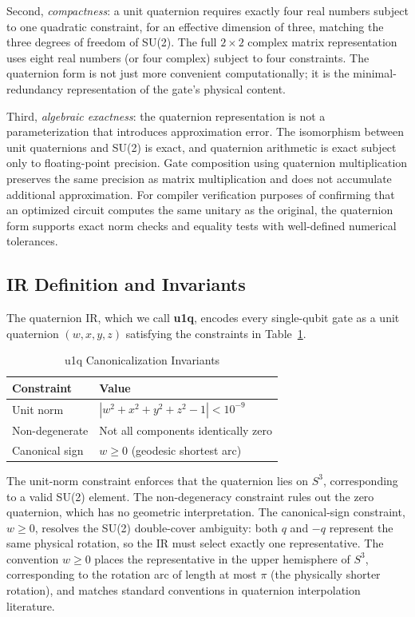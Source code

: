 \documentclass[conference]{IEEEtran}
\begin{document}
Second, \textit{compactness}: a unit quaternion requires exactly four real numbers subject
to one quadratic constraint, for an effective dimension of three, matching the three
degrees of freedom of SU(2). The full $2\times2$ complex matrix representation uses eight
real numbers (or four complex) subject to four constraints. The quaternion form is not just
more convenient computationally; it is the minimal-redundancy representation of the gate's
physical content.

Third, \textit{algebraic exactness}: the quaternion representation is not a parameterization
that introduces approximation error. The isomorphism between unit quaternions and SU(2) is
exact, and quaternion arithmetic is exact subject only to floating-point precision. Gate
composition using quaternion multiplication preserves the same precision as matrix
multiplication and does not accumulate additional approximation. For compiler verification
purposes of confirming that an optimized circuit computes the same unitary as the
original, the quaternion form supports exact norm checks and equality tests with
well-defined numerical tolerances.

\subsection{IR Definition and Invariants}

The quaternion IR, which we call \textbf{u1q}, encodes every single-qubit gate as a unit
quaternion $(w, x, y, z)$ satisfying the constraints in Table~\ref{tab:invariants}.

\begin{table}[htbp]
\caption{u1q Canonicalization Invariants}
\begin{center}
\begin{tabular}{ll}
\toprule
\textbf{Constraint} & \textbf{Value} \\
\midrule
Unit norm      & $|w^2 + x^2 + y^2 + z^2 - 1| < 10^{-9}$ \\
Non-degenerate & Not all components identically zero \\
Canonical sign & $w \geq 0$ (geodesic shortest arc) \\
\bottomrule
\end{tabular}
\label{tab:invariants}
\end{center}
\end{table}

The unit-norm constraint enforces that the quaternion lies on $S^3$, corresponding to a
valid SU(2) element. The non-degeneracy constraint rules out the zero quaternion, which
has no geometric interpretation. The canonical-sign constraint, $w \geq 0$, resolves
the SU(2) double-cover ambiguity: both $q$ and $-q$ represent the same physical rotation,
so the IR must select exactly one representative. The convention $w \geq 0$ places the
representative in the upper hemisphere of $S^3$, corresponding to the rotation arc of
length at most $\pi$ (the physically shorter rotation), and matches standard conventions
in quaternion interpolation literature.
\end{document}
